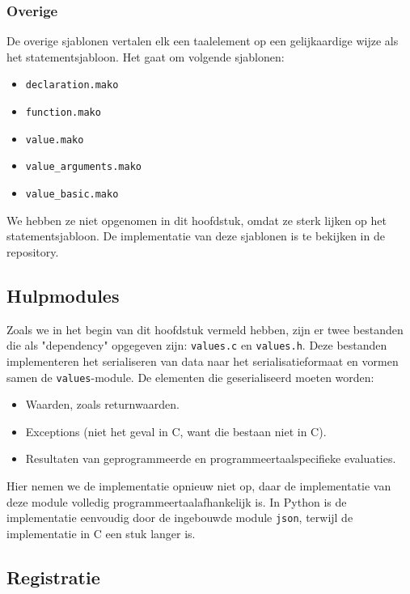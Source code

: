 \subsubsection{Overige}

De overige sjablonen vertalen elk een taalelement op een gelijkaardige wijze als het statementsjabloon.
Het gaat om volgende sjablonen:

\begin{itemize}
    \item \texttt{declaration.mako}
    \item \texttt{function.mako}
    \item \texttt{value.mako}
    \item \texttt{value\_arguments.mako}
    \item \texttt{value\_basic.mako}
\end{itemize}

We hebben ze niet opgenomen in dit hoofdstuk, omdat ze sterk lijken op het statementsjabloon.
De implementatie van deze sjablonen is te bekijken in de repository.

\subsection{Hulpmodules}\label{subsec:hulpmodules}

Zoals we in het begin van dit hoofdstuk vermeld hebben, zijn er twee bestanden die als "dependency" opgegeven zijn: \texttt{values.c} en \texttt{values.h}.
Deze bestanden implementeren het serialiseren van data naar het serialisatieformaat en vormen samen de \texttt{values}-module.
De elementen die geserialiseerd moeten worden:

\begin{itemize}
    \item Waarden, zoals returnwaarden.
    \item Exceptions (niet het geval in C, want die bestaan niet in C).
    \item Resultaten van geprogrammeerde en programmeertaalspecifieke evaluaties.
\end{itemize}

Hier nemen we de implementatie opnieuw niet op, daar de implementatie van deze module volledig programmeertaalafhankelijk is.
In Python is de implementatie eenvoudig door de ingebouwde module \texttt{json}, terwijl de implementatie in C een stuk langer is.

\subsection{Registratie}\label{subsec:registratie}

